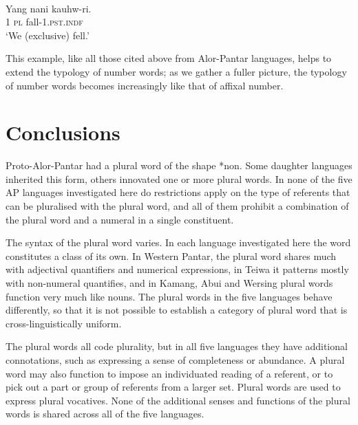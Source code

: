 \ea%
\label{ex:9:113}
 \\
\gll   Yang nani {kauhw-ri.}\\
  1 \textsc{pl} fall-1.\textsc{pst.indf}  \\
\glt `We (exclusive) fell.'
\z






This example, like all those cited above from Alor-Pantar languages, helps to extend the typology of number words; as we gather a fuller picture, the typology of number words becomes increasingly like that of affixal number.


\section{Conclusions} %
\label{sec:9:6}
Proto-Alor-Pantar had a plural word of the shape *{non}. Some daughter languages inherited this form, others innovated one or more plural words. In none of the five AP languages investigated here do restrictions apply on the type of referents that can be pluralised with the plural word, and all of them prohibit a combination of the plural word and a numeral in a single constituent.

 The syntax of the plural word varies. In each language investigated here the word constitutes a class of its own. In Western Pantar, the plural word shares much with adjectival quantifiers and numerical expressions, in Teiwa it patterns mostly with non-numeral quantifies, and in Kamang, Abui and Wersing plural words function very much like nouns. The plural words in the five languages behave differently, so that it is not possible to establish a category of plural word that is cross-linguistically uniform.

 The plural words all code plurality, but in all five languages they have additional connotations, such as expressing a sense of completeness or abundance. A plural word may also function to impose an individuated reading of a referent, or to pick out a part or group of referents from a larger set. Plural words are used to express plural vocatives. None of the additional senses and functions of the plural words is shared across all of the five languages.

